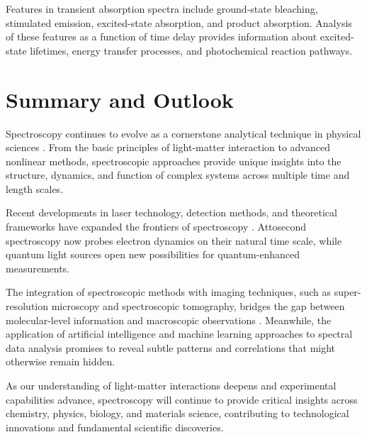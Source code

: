 \noindent Features in transient absorption spectra include ground-state bleaching, stimulated emission, excited-state absorption, and product absorption. Analysis of these features as a function of time delay provides information about excited-state lifetimes, energy transfer processes, and photochemical reaction pathways.


\section{Summary and Outlook}
\label{sec:summary}

\noindent Spectroscopy continues to evolve as a cornerstone analytical technique in physical sciences \cite{Mukamel1995, Cho2009}. From the basic principles of light-matter interaction to advanced nonlinear methods, spectroscopic approaches provide unique insights into the structure, dynamics, and function of complex systems across multiple time and length scales.

\noindent Recent developments in laser technology, detection methods, and theoretical frameworks have expanded the frontiers of spectroscopy \cite{Jonas2003, Shim2006}. Attosecond spectroscopy now probes electron dynamics on their natural time scale, while quantum light sources open new possibilities for quantum-enhanced measurements.

\noindent The integration of spectroscopic methods with imaging techniques, such as super-resolution microscopy and spectroscopic tomography, bridges the gap between molecular-level information and macroscopic observations \cite{Brixner2005}. Meanwhile, the application of artificial intelligence and machine learning approaches to spectral data analysis promises to reveal subtle patterns and correlations that might otherwise remain hidden.

\noindent As our understanding of light-matter interactions deepens and experimental capabilities advance, spectroscopy will continue to provide critical insights across chemistry, physics, biology, and materials science, contributing to technological innovations and fundamental scientific discoveries.